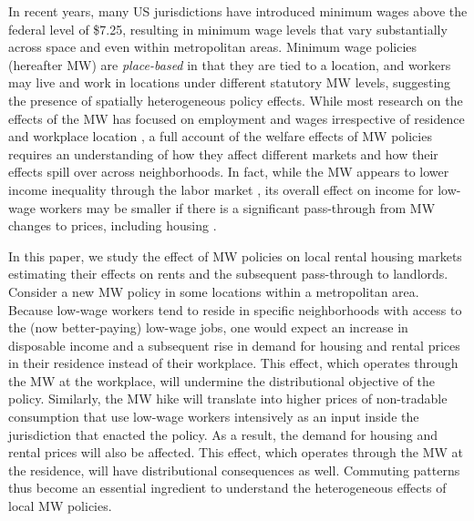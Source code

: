 

In recent years, many US jurisdictions have introduced minimum wages above the 
federal level of \$7.25, resulting in minimum wage levels that vary 
substantially across space and even within metropolitan areas.
Minimum wage policies (hereafter MW) are \textit{place-based} in that they are 
tied to a location, and workers may live and work in locations under different 
statutory MW levels, suggesting the presence of spatially heterogeneous policy 
effects.
While most research on the effects of the MW has focused on employment and 
wages irrespective of residence and workplace location
\parencite[e.g.,][]{CardKrueger1994, CegnizEtAl2019},
a full account of the welfare effects of MW policies requires an understanding 
of how they affect different markets and how their effects spill over across 
neighborhoods.
In fact, while the MW appears to lower income inequality through the labor 
market \parencite{Lee1999, AutorEtAl2016},
its overall effect on income for low-wage workers may be smaller if there is 
a significant pass-through from MW changes to prices, including housing
\parencite{Macurdy2015}.

In this paper, we study the effect of MW policies on local rental housing 
markets estimating their effects on rents and the subsequent pass-through
to landlords.
Consider a new MW policy in some locations within a metropolitan area.
Because low-wage workers tend to reside in specific neighborhoods with access 
to the (now better-paying) low-wage jobs,
one would expect an increase in disposable income and a subsequent rise in 
demand for housing and rental prices in their residence instead of their 
workplace.
This effect, which operates through the MW at the workplace, will undermine 
the distributional objective of the policy.
Similarly, the MW hike will translate into higher prices of non-tradable 
consumption that use low-wage workers intensively as an input inside the 
jurisdiction that enacted the policy.
As a result, the demand for housing and rental prices will also be affected.
This effect, which operates through the MW at the residence, will have 
distributional consequences as well.
Commuting patterns thus become an essential ingredient to understand the 
heterogeneous effects of local MW policies.

